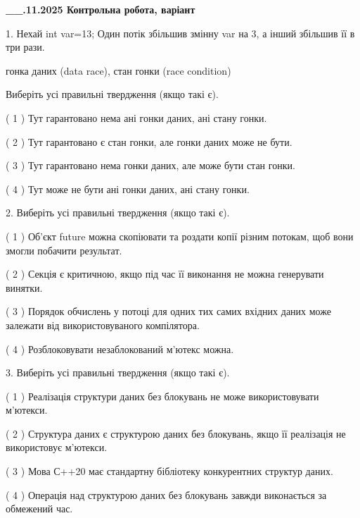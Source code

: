 \documentclass[12pt, ukrainian]{article}
\begin{document}
\newpage
\begin {large}

\textbf{\_\_.11.2025 Контрольна робота, варіант  }\par


{
1. Нехай int var=13; Один потік збільшив змінну var на 3, а інший збільшив її в три рази.

гонка даних (data race), стан гонки (race condition)

Виберіть усі правильні твердження (якщо такі є).\par
\vspace{2mm}
( 1 ) Тут гарантовано нема ані гонки даних, ані стану гонки.%

( 2 ) Тут гарантовано є стан гонки, але гонки даних може не бути.%

( 3 ) Тут гарантовано нема гонки даних, але може бути стан гонки.%

( 4 ) Тут може не бути ані гонки даних, ані стану гонки.%


2. Виберіть усі правильні твердження (якщо такі є).\par
\vspace{2mm}

( 1 ) Об’єкт future можна скопіювати та роздати копії різним потокам, щоб вони змогли побачити результат.%

( 2 ) Секція є критичною, якщо під час її виконання не можна генерувати винятки.%

( 3 ) Порядок обчислень у потоці для одних тих самих вхідних даних може залежати від використовуваного компілятора.%

( 4 ) Розблоковувати незаблокований м’ютекс можна.%


3. Виберіть усі правильні твердження (якщо такі є).\par
\vspace{2mm}

( 1 ) Реалізація структури даних без блокувань не може використовувати м’ютекси.%

( 2 ) Структура даних є структурою даних без блокувань, якщо її реалізація не використовує м’ютекси.%

( 3 ) Мова С++20 має стандартну бібліотеку конкурентних структур даних.%

( 4 ) Операція над структурою даних без блокувань завжди виконається за обмежений час.%


}
\end{large}
\end{document}
